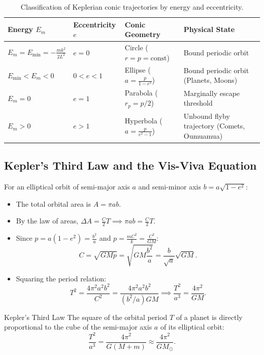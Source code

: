 \begin{table}[htbp]
\centering
\renewcommand{\arraystretch}{1.35}
\begin{tabular}{@{}llll@{}}
\toprule
\textbf{Energy $E_m$} & \textbf{Eccentricity $e$} & \textbf{Conic Geometry} & \textbf{Physical State} \\
\midrule
$E_m = E_{\min} = -\frac{m k^2}{2 L^2}$ & $e = 0$ & Circle ($r = p = \text{const}$) & Bound periodic orbit \\
$E_{\min} < E_m < 0$ & $0 < e < 1$ & Ellipse ($a = \frac{p}{1-e^2}$) & Bound periodic orbit (Planets, Moons) \\
$E_m = 0$ & $e = 1$ & Parabola ($r_p = p/2$) & Marginally escape threshold \\
$E_m > 0$ & $e > 1$ & Hyperbola ($a = \frac{p}{e^2-1}$) & Unbound flyby trajectory (Comets, Oumuamua) \\
\bottomrule
\end{tabular}
\caption{Classification of Keplerian conic trajectories by energy and eccentricity.}
\label{tab:kepler_conics}
\end{table}

\subsection{Kepler's Third Law and the Vis-Viva Equation}

For an elliptical orbit of semi-major axis $a$ and semi-minor axis $b = a\sqrt{1-e^2}$:
\begin{itemize}[leftmargin=1.5em,itemsep=3pt]
  \item The total orbital area is $A = \pi a b$.
  \item By the law of areas, $\Delta A = \frac{C}{2} T \implies \pi a b = \frac{C}{2} T$.
  \item Since $p = a(1-e^2) = \frac{b^2}{a}$ and $p = \frac{m C^2}{k} = \frac{C^2}{G M}$:
  \[
  C = \sqrt{G M p} = \sqrt{G M \frac{b^2}{a}} = \frac{b}{\sqrt{a}}\sqrt{G M}.
  \]
  \item Squaring the period relation:
  \begin{equation}
  T^2 = \frac{4\pi^2 a^2 b^2}{C^2} = \frac{4\pi^2 a^2 b^2}{(b^2/a) G M} \implies \frac{T^2}{a^3} = \frac{4\pi^2}{G M}.
  \end{equation}
\end{itemize}

\begin{lawbox}{Kepler's Third Law}
The square of the orbital period $T$ of a planet is directly proportional to the cube of the semi-major axis $a$ of its elliptical orbit:
\begin{equation}
\frac{T^2}{a^3} = \frac{4\pi^2}{G(M + m)} \approx \frac{4\pi^2}{G M_\odot}.
\end{equation}
\end{lawbox}

